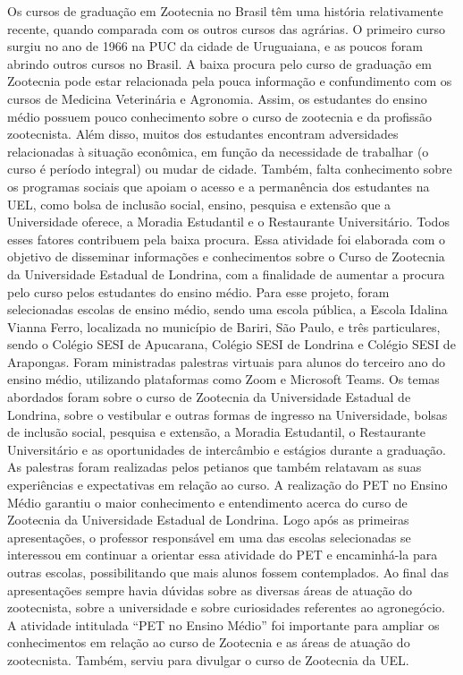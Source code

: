 Os cursos de graduação em Zootecnia no Brasil têm uma história relativamente recente, quando
comparada com os outros cursos das agrárias. O primeiro curso surgiu no ano de 1966 na PUC
da cidade de Uruguaiana, e as poucos foram abrindo outros cursos no Brasil. A baixa procura
pelo curso de graduação em Zootecnia pode estar relacionada pela pouca informação e
confundimento com os cursos de Medicina Veterinária e Agronomia. Assim, os estudantes do
ensino médio possuem pouco conhecimento sobre o curso de zootecnia e da profissão
zootecnista. Além disso, muitos dos estudantes encontram adversidades relacionadas à situação
econômica, em função da necessidade de trabalhar (o curso é período integral) ou mudar de
cidade. Também, falta conhecimento sobre os programas sociais que apoiam o acesso e a
permanência dos estudantes na UEL, como bolsa de inclusão social, ensino, pesquisa e extensão
que a Universidade oferece, a Moradia Estudantil e o Restaurante Universitário. Todos esses
fatores contribuem pela baixa procura. Essa atividade foi elaborada com o objetivo de disseminar
informações e conhecimentos sobre o Curso de Zootecnia da Universidade Estadual de Londrina,
com a finalidade de aumentar a procura pelo curso pelos estudantes do ensino médio. Para esse
projeto, foram selecionadas escolas de ensino médio, sendo uma escola pública, a Escola Idalina
Vianna Ferro, localizada no município de Bariri, São Paulo, e três particulares, sendo o Colégio
SESI de Apucarana, Colégio SESI de Londrina e Colégio SESI de Arapongas. Foram
ministradas palestras virtuais para alunos do terceiro ano do ensino médio, utilizando
plataformas como Zoom e Microsoft Teams. Os temas abordados foram sobre o curso de
Zootecnia da Universidade Estadual de Londrina, sobre o vestibular e outras formas de ingresso
na Universidade, bolsas de inclusão social, pesquisa e extensão, a Moradia Estudantil, o
Restaurante Universitário e as oportunidades de intercâmbio e estágios durante a graduação. As
palestras foram realizadas pelos petianos que também relatavam as suas experiências e
expectativas em relação ao curso. A realização do PET no Ensino Médio garantiu o maior
conhecimento e entendimento acerca do curso de Zootecnia da Universidade Estadual de
Londrina. Logo após as primeiras apresentações, o professor responsável em uma das escolas
selecionadas se interessou em continuar a orientar essa atividade do PET e encaminhá-la para
outras escolas, possibilitando que mais alunos fossem contemplados. Ao final das apresentações
sempre havia dúvidas sobre as diversas áreas de atuação do zootecnista, sobre a universidade e
sobre curiosidades referentes ao agronegócio. A atividade intitulada “PET no Ensino Médio” foi
importante para ampliar os conhecimentos em relação ao curso de Zootecnia e as áreas de
atuação do zootecnista. Também, serviu para divulgar o curso de Zootecnia da UEL.

